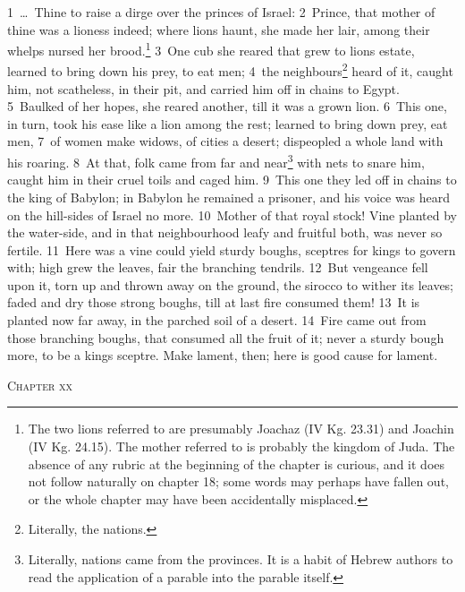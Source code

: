 \documentclass[10pt]{book} %
\begin{document}
\textcolor{benred8}{1}~\ldots\  Thine to raise a dirge over the princes of Israel: \textcolor{benred8}{2}~Prince, that mother of thine was a lioness indeed; where lions haunt, she made her lair, among their whelps nursed her brood.\footnote[1]{The two lions referred to are presumably Joachaz (IV Kg. 23.31) and Joachin (IV Kg. 24.15). The mother referred to is probably the kingdom of Juda. The absence of any rubric at the beginning of the chapter is curious, and it does not follow naturally on chapter 18; some words may perhaps have fallen out, or the whole chapter may have been accidentally misplaced.} \textcolor{benred8}{3}~One cub she reared that grew to lion\textquotesingle s estate, learned to bring down his prey, to eat men; \textcolor{benred8}{4}~the neighbours\footnote[2]{\textasciigrave Literally, \textasciigrave the nations\textquotesingle .} heard of it, caught him, not scatheless, in their pit, and carried him off in chains to Egypt. \textcolor{benred8}{5}~Baulked of her hopes, she reared another, till it was a grown lion. \textcolor{benred8}{6}~This one, in turn, took his ease like a lion among the rest; learned to bring down prey, eat men, \textcolor{benred8}{7}~of women make widows, of cities a desert; dispeopled a whole land with his roaring. \textcolor{benred8}{8}~At that, folk came from far and near\footnote[3]{Literally, \textasciigrave nations came from the provinces\textquotesingle . It is a habit of Hebrew authors to read the application of a parable into the parable itself.} with nets to snare him, caught him in their cruel toils and caged him. \textcolor{benred8}{9}~This one they led off in chains to the king of Babylon; in Babylon he remained a prisoner, and his voice was heard on the hill-sides of Israel no more.
\textcolor{benred8}{10}~Mother of that royal stock! Vine planted by the water-side, and in that neighbourhood leafy and fruitful both, was never so fertile. \textcolor{benred8}{11}~Here was a vine could yield sturdy boughs, sceptres for kings to govern with; high grew the leaves, fair the branching tendrils. \textcolor{benred8}{12}~But vengeance fell upon it, torn up and thrown away on the ground, the sirocco to wither its leaves; faded and dry those strong boughs, till at last fire consumed them! \textcolor{benred8}{13}~It is planted now far away, in the parched soil of a desert. \textcolor{benred8}{14}~Fire came out from those branching boughs, that consumed all the fruit of it; never a sturdy bough more, to be a king\textquotesingle s sceptre. Make lament, then; here is good cause for lament.
\begin{large}\begin{center}\textsc{Chapter xx}\end{center}\end{large}
\end{document}
